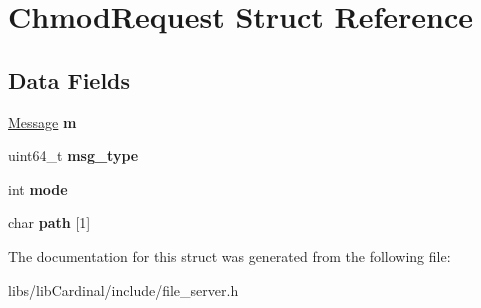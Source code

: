 \hypertarget{structChmodRequest}{}\section{Chmod\+Request Struct Reference}
\label{structChmodRequest}
\subsection*{Data Fields}
\begin{DoxyCompactItemize}
\item 
\hyperlink{structMessage}{Message} {\bfseries m}\hypertarget{structChmodRequest_ac86ef55424e47624d51a7591b1a35ba0}{}\label{structChmodRequest_ac86ef55424e47624d51a7591b1a35ba0}

\item 
uint64\+\_\+t {\bfseries msg\+\_\+type}\hypertarget{structChmodRequest_a423308de3e94e0504a157d3771e155a5}{}\label{structChmodRequest_a423308de3e94e0504a157d3771e155a5}

\item 
int {\bfseries mode}\hypertarget{structChmodRequest_a9406d698cc6c0704ec9a47e377b7c969}{}\label{structChmodRequest_a9406d698cc6c0704ec9a47e377b7c969}

\item 
char {\bfseries path} \mbox{[}1\mbox{]}\hypertarget{structChmodRequest_ac15c853b56444a3d5395be0981e21ea7}{}\label{structChmodRequest_ac15c853b56444a3d5395be0981e21ea7}

\end{DoxyCompactItemize}


The documentation for this struct was generated from the following file\+:\begin{DoxyCompactItemize}
\item 
libs/lib\+Cardinal/include/file\+\_\+server.\+h\end{DoxyCompactItemize}
